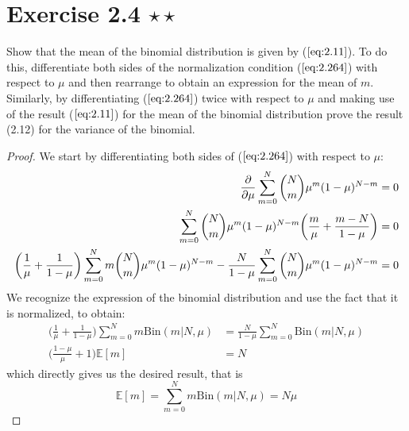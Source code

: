 \section*{Exercise 2.4 $\star \star$}
Show that the mean of the binomial distribution is given by
($\ref{eq:2.11}$). To do this, differentiate both sides of the normalization condition
($\ref{eq:2.264}$) with respect to $\mu$ and then rearrange to obtain an
expression for the mean of $m$. Similarly, by differentiating ($\ref{eq:2.264}$)
twice with respect to $\mu$ and making use of the result ($\ref{eq:2.11}$) for the mean
of the binomial distribution prove the result (2.12) for the variance of the binomial.

\begin{proof}
    We start by differentiating both sides of ($\ref{eq:2.264}$)
    with respect to $\mu$:
    \begin{align*}
        \pdv{\mu} \sum_{m=0}^{N} \binom{N}{m} \mu^m(1-\mu)^{N - m} &= 0 \\
        \sum_{m=0}^{N} \binom{N}{m} \mu^m(1 - \mu)^{N - m}
        \bigg(\frac{m}{\mu} + \frac{m-N}{1-\mu}\bigg) &= 0 \\
        \bigg(\frac{1}{\mu} + \frac{1}{1 - \mu}\bigg)
        \sum_{m=0}^{N} m \binom{N}{m} \mu^m(1 - \mu)^{N - m} 
        - \frac{N}{1-\mu} \sum_{m=0}^{N} \binom{N}{m} \mu^m(1 - \mu)^{N - m} &= 0
    \end{align*}
    We recognize the expression of the binomial distribution and
    use the fact that it is normalized, to obtain:
    \begin{align*}
        \bigg(\frac{1}{\mu} + \frac{1}{1 - \mu}\bigg)
        \sum_{m=0}^{N} m\text{Bin}(m | N, \mu) 
        &= \frac{N}{1-\mu} \sum_{m=0}^{N} \text{Bin}(m | N, \mu) \\
        \bigg(\frac{1 - \mu}{\mu} + 1\bigg) \mathbb{E}[m] &= N
    \end{align*}
    which directly gives us the desired result, that is
    \begin{equation}\label{eq:2.11}\tag{2.11}
        \mathbb{E}[m] = \sum_{m=0}^{N} m\text{Bin}(m | N, \mu) = N\mu
    \end{equation}


\end{proof}
